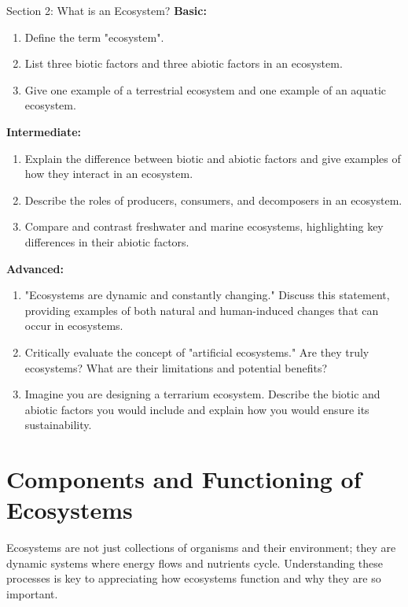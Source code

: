\begin{tieredquestions}{Section 2: What is an Ecosystem?}
\textbf{Basic:}
\begin{enumerate}
    \item Define the term "ecosystem".
    \item List three biotic factors and three abiotic factors in an ecosystem.
    \item Give one example of a terrestrial ecosystem and one example of an aquatic ecosystem.
\end{enumerate}

\textbf{Intermediate:}
\begin{enumerate}
    \item Explain the difference between biotic and abiotic factors and give examples of how they interact in an ecosystem.
    \item Describe the roles of producers, consumers, and decomposers in an ecosystem.
    \item Compare and contrast freshwater and marine ecosystems, highlighting key differences in their abiotic factors.
\end{enumerate}

\textbf{Advanced:}
\begin{enumerate}
    \item  "Ecosystems are dynamic and constantly changing." Discuss this statement, providing examples of both natural and human-induced changes that can occur in ecosystems.
    \item Critically evaluate the concept of "artificial ecosystems." Are they truly ecosystems? What are their limitations and potential benefits?
    \item  Imagine you are designing a terrarium ecosystem. Describe the biotic and abiotic factors you would include and explain how you would ensure its sustainability.
\end{enumerate}
\end{tieredquestions}


\section{Components and Functioning of Ecosystems}

Ecosystems are not just collections of organisms and their environment; they are dynamic systems where energy flows and nutrients cycle. Understanding these processes is key to appreciating how ecosystems function and why they are so important.

